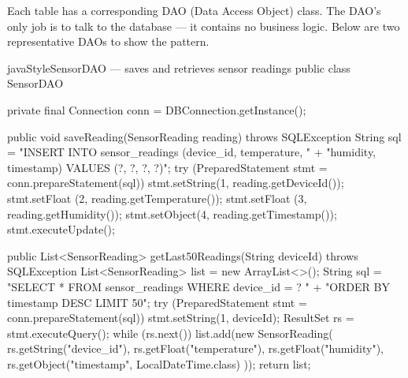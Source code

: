 \documentclass[12pt, a4paper]{report}
\begin{document}
Each table has a corresponding DAO (Data Access Object) class. The DAO's only job is to talk to the database --- it contains no business logic. Below are two representative DAOs to show the pattern.

\begin{codeblock}{javaStyle}{SensorDAO --- saves and retrieves sensor readings}
public class SensorDAO {
    private final Connection conn = DBConnection.getInstance();

    public void saveReading(SensorReading reading) throws SQLException {
        String sql = "INSERT INTO sensor_readings (device_id, temperature, "
                   + "humidity, timestamp) VALUES (?, ?, ?, ?)";
        try (PreparedStatement stmt = conn.prepareStatement(sql)) {
            stmt.setString(1, reading.getDeviceId());
            stmt.setFloat (2, reading.getTemperature());
            stmt.setFloat (3, reading.getHumidity());
            stmt.setObject(4, reading.getTimestamp());
            stmt.executeUpdate();
        }
    }

    public List<SensorReading> getLast50Readings(String deviceId)
            throws SQLException {
        List<SensorReading> list = new ArrayList<>();
        String sql = "SELECT * FROM sensor_readings WHERE device_id = ? "
                   + "ORDER BY timestamp DESC LIMIT 50";
        try (PreparedStatement stmt = conn.prepareStatement(sql)) {
            stmt.setString(1, deviceId);
            ResultSet rs = stmt.executeQuery();
            while (rs.next()) {
                list.add(new SensorReading(
                    rs.getString("device_id"),
                    rs.getFloat("temperature"),
                    rs.getFloat("humidity"),
                    rs.getObject("timestamp", LocalDateTime.class)
                ));
            }
        }
        return list;
    }
}
\end{codeblock}
\end{document}

